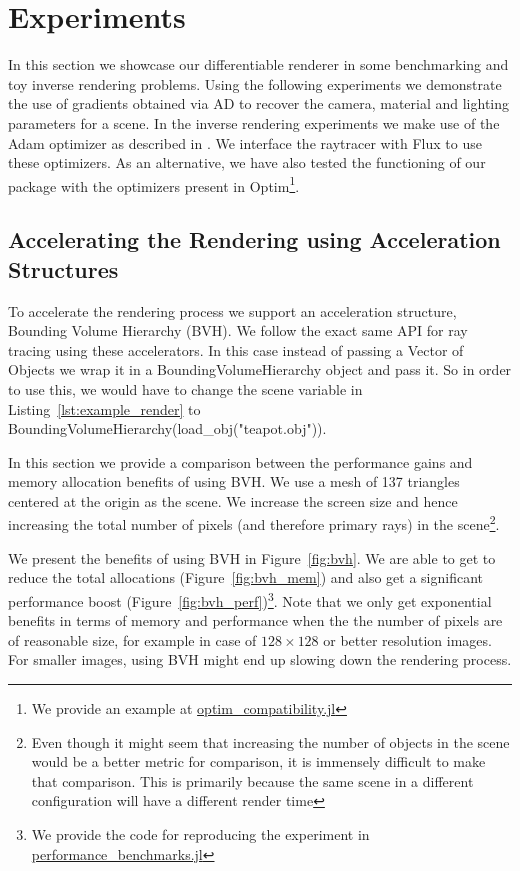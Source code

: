 \documentclass{juliacon}
\begin{document}
\section{Experiments}

In this section we showcase our differentiable renderer in some benchmarking and toy inverse rendering problems. Using the following experiments we demonstrate the use of gradients obtained via AD to recover the camera, material and lighting parameters for a scene. In the inverse rendering experiments we make use of the Adam optimizer as described in \cite{kingma2014adam}. We interface the raytracer with Flux to use these optimizers. As an alternative, we have also tested the functioning of our package with the optimizers present in Optim\footnote{\raggedright{We provide an example at \href{https://github.com/avik-pal/RayTracer.jl/examples/optim\_compatibility.jl}{optim\_compatibility.jl}}}.

\subsection{Accelerating the Rendering using Acceleration Structures}

To accelerate the rendering process we support an acceleration structure, Bounding Volume Hierarchy (BVH)\cite{Kay:1986:RTC:15922.15916}. We follow the exact same API for ray tracing using these accelerators. In this case instead of passing a Vector of Objects we wrap it in a BoundingVolumeHierarchy object and pass it. So in order to use this, we would have to change the scene variable in Listing~\ref{lst:example_render} to BoundingVolumeHierarchy(load\_obj("teapot.obj")).

In this section we provide a comparison between the performance gains and memory allocation benefits of using BVH. We use a mesh of 137 triangles centered at the origin as the scene. We increase the screen size and hence increasing the total number of pixels (and therefore primary rays) in the scene\footnote{Even though it might seem that increasing the number of objects in the scene would be a better metric for comparison, it is immensely difficult to make that comparison. This is primarily because the same scene in a different configuration will have a different render time}.

We present the benefits of using BVH in Figure~\ref{fig:bvh}. We are able to get to reduce the total allocations (Figure~\ref{fig:bvh_mem}) and also get a significant performance boost (Figure~\ref{fig:bvh_perf})\footnote{\raggedright{We provide the code for reproducing the experiment in \href{https://github.com/avik-pal/RayTracer.jl/examples/performance\_benchmarks.jl}{performance\_benchmarks.jl}}}. Note that we only get exponential benefits in terms of memory and performance when the the number of pixels are of reasonable size, for example in case of $128 \times 128$ or better resolution images. For smaller images, using BVH might end up slowing down the rendering process.
\end{document}
